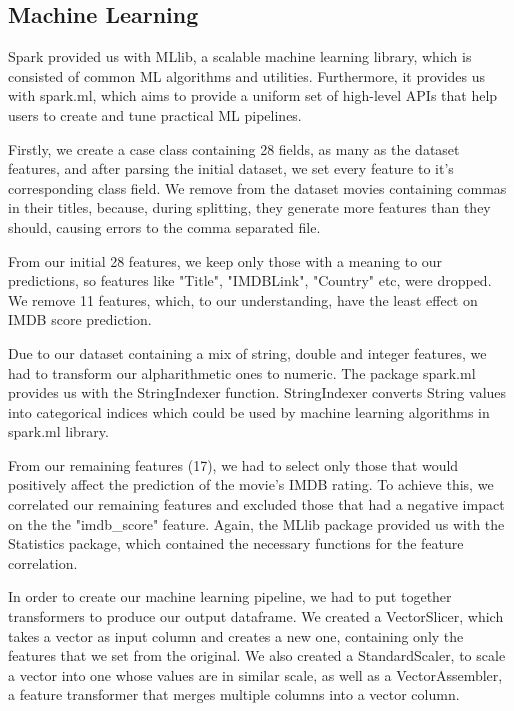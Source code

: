 \documentclass[letterpaper,twocolumn,10pt]{article}
\begin{document}
\subsection{Machine Learning}
Spark provided us with MLlib, a scalable machine learning library, which is consisted of common ML algorithms and utilities. Furthermore, it provides us with spark.ml, which aims to provide a uniform set of high-level APIs that help users to create and tune practical ML pipelines. 

\par Firstly, we create a case class containing 28 fields, as many as the dataset features, and after parsing the initial dataset, we set every feature to it's corresponding class field. We remove from the dataset movies containing commas in their titles, because, during splitting, they generate more features than they should, causing errors to the comma separated file.\par 

From our initial 28 features, we keep only those with a meaning to our predictions, so features like "Title", "IMDBLink", "Country" etc, were dropped. We remove 11 features, which, to our understanding, have the least effect on IMDB score prediction. \par 

Due to our dataset containing a mix of string, double and integer features, we had to transform our alpharithmetic ones to numeric. The package spark.ml provides us with the StringIndexer function. StringIndexer converts String values into categorical indices which could be used by machine learning algorithms in spark.ml library.\par 

From our remaining features (17), we had to select only those that would positively affect the prediction of the movie's IMDB rating. To achieve this, we correlated our remaining features and excluded those that had a negative impact on the the "imdb\_score" feature. Again, the MLlib package provided us with the Statistics package, which contained the necessary functions for the feature correlation.\par 

In order to create our machine learning pipeline, we had to put together transformers to produce our output dataframe. We created a VectorSlicer, which takes a vector as input column and creates a new one, containing only the features that we set from the original. We also created a StandardScaler, to scale a vector into one whose values are in similar scale, as well as a VectorAssembler, a feature transformer that merges multiple columns into a vector column.\par 
\end{document}
